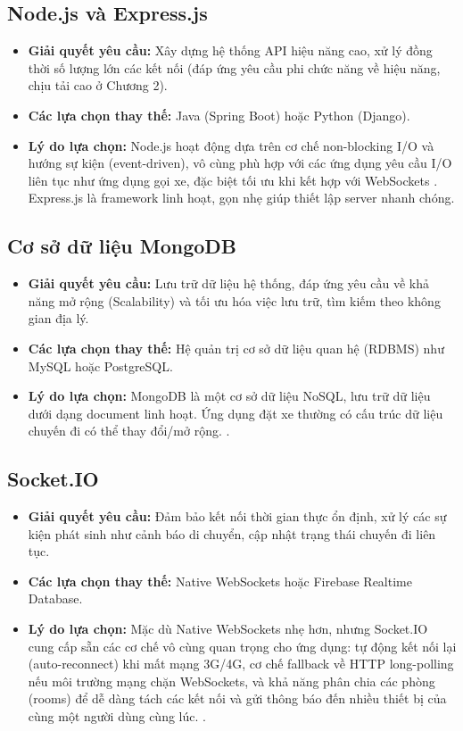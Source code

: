 \documentclass[../DoAn.tex]{subfiles}
\begin{document}
\subsection{Node.js và Express.js}
\begin{itemize}
    \item \textbf{Giải quyết yêu cầu:} Xây dựng hệ thống API hiệu năng cao, xử lý đồng thời số lượng lớn các kết nối (đáp ứng yêu cầu phi chức năng về hiệu năng, chịu tải cao ở Chương 2).
    \item \textbf{Các lựa chọn thay thế:} Java (Spring Boot) hoặc Python (Django).
    \item \textbf{Lý do lựa chọn:} Node.js hoạt động dựa trên cơ chế non-blocking I/O và hướng sự kiện (event-driven), vô cùng phù hợp với các ứng dụng yêu cầu I/O liên tục như ứng dụng gọi xe, đặc biệt tối ưu khi kết hợp với WebSockets \cite{Nodejs_Reference}. Express.js là framework linh hoạt, gọn nhẹ giúp thiết lập server nhanh chóng.
\end{itemize}

\subsection{Cơ sở dữ liệu MongoDB}
\begin{itemize}
    \item \textbf{Giải quyết yêu cầu:} Lưu trữ dữ liệu hệ thống, đáp ứng yêu cầu về khả năng mở rộng (Scalability) và tối ưu hóa việc lưu trữ, tìm kiếm theo không gian địa lý.
    \item \textbf{Các lựa chọn thay thế:} Hệ quản trị cơ sở dữ liệu quan hệ (RDBMS) như MySQL hoặc PostgreSQL.
    \item \textbf{Lý do lựa chọn:} MongoDB là một cơ sở dữ liệu NoSQL, lưu trữ dữ liệu dưới dạng document linh hoạt. Ứng dụng đặt xe thường có cấu trúc dữ liệu chuyến đi có thể thay đổi/mở rộng. \cite{MongoDB_Reference}.
\end{itemize}

\subsection{Socket.IO}
\begin{itemize}
    \item \textbf{Giải quyết yêu cầu:} Đảm bảo kết nối thời gian thực ổn định, xử lý các sự kiện phát sinh như cảnh báo di chuyển, cập nhật trạng thái chuyến đi liên tục.
    \item \textbf{Các lựa chọn thay thế:} Native WebSockets hoặc Firebase Realtime Database.
    \item \textbf{Lý do lựa chọn:} Mặc dù Native WebSockets nhẹ hơn, nhưng Socket.IO cung cấp sẵn các cơ chế vô cùng quan trọng cho ứng dụng: tự động kết nối lại (auto-reconnect) khi mất mạng 3G/4G, cơ chế fallback về HTTP long-polling nếu môi trường mạng chặn WebSockets, và khả năng phân chia các phòng (rooms) để dễ dàng tách các kết nối và gửi thông báo đến nhiều thiết bị của cùng một người dùng cùng lúc. \cite{SocketIO_Reference}.
\end{itemize}
\end{document}

